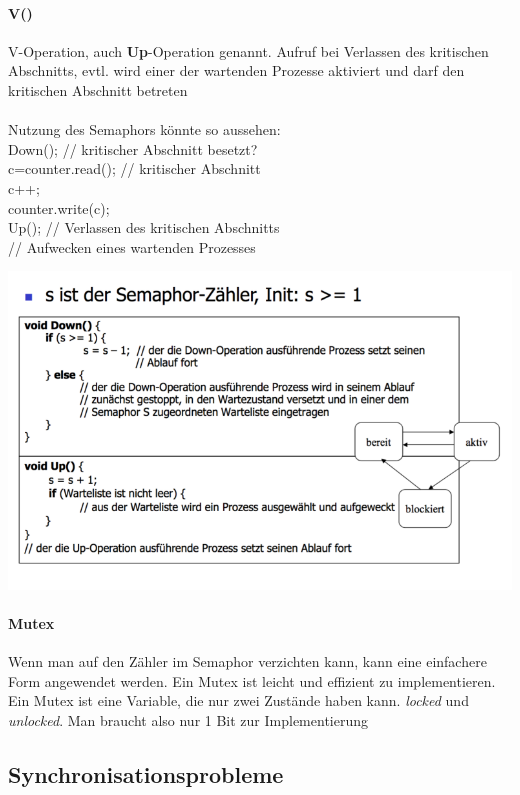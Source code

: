 \documentclass[11pt,a4paper,landscape]{article}
\newenvironment{allesInCode}{\ttfamily}{\par}
\begin{document}
\begin{multicols*}{3}
	\paragraph{V()} V-Operation, auch \textbf{Up}-Operation genannt. Aufruf bei Verlassen des kritischen Abschnitts, evtl. wird einer der wartenden Prozesse aktiviert und darf den kritischen Abschnitt betreten\\\\
	Nutzung des Semaphors könnte so aussehen:\\
	\begin{allesInCode}
		Down(); // kritischer Abschnitt besetzt? \\
		c=counter.read(); // kritischer Abschnitt \\
		c++; \\
		counter.write(c); \\
		Up(); // Verlassen des kritischen Abschnitts \\
		// Aufwecken eines wartenden Prozesses \\
	\end{allesInCode}
	\includegraphics[width=0.9\columnwidth]{semaphor}
	\paragraph{Mutex} Wenn man auf den Zähler im Semaphor verzichten kann, kann eine einfachere Form angewendet werden. Ein Mutex ist leicht und effizient zu implementieren. Ein Mutex ist eine Variable, die nur zwei Zustände haben kann. \textit{locked} und \textit{unlocked}. Man braucht also nur 1 Bit zur Implementierung
	\subsection{Synchronisationsprobleme}

\end{multicols*}
\end{document}

